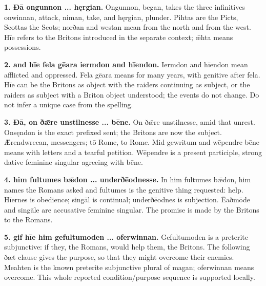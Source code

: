 \textbf{1. Ðā ongunnon ... hęrgian.} Ongunnon, began, takes the three infinitives onwinnan, attack, niman, take, and hęrgian, plunder. Pihtas are the Picts, Scottas the Scots; norðan and westan mean from the north and from the west. Hīe refers to the Britons introduced in the separate context; ǣhta means possessions.

\textbf{2. and hīe fela gēara iermdon and hīendon.} Iermdon and hīendon mean afflicted and oppressed. Fela gēara means for many years, with genitive after fela. Hīe can be the Britons as object with the raiders continuing as subject, or the raiders as subject with a Briton object understood; the events do not change. Do not infer a unique case from the spelling.

\textbf{3. Ðā, on ðǣre unstilnesse ... bēne.} On ðǣre unstilnesse, amid that unrest. Onsęndon is the exact prefixed sent; the Britons are now the subject. Ǣrendwrecan, messengers; tō Rome, to Rome. Mid gewritum and wēpendre bēne means with letters and a tearful petition. Wēpendre is a present participle, strong dative feminine singular agreeing with bēne.

\textbf{4. him fultumes bǣdon ... underðēodnesse.} In him fultumes bǣdon, him names the Romans asked and fultumes is the genitive thing requested: help. Hīernes is obedience; singāl is continual; underðēodnes is subjection. Ēaðmōde and singāle are accusative feminine singular. The promise is made by the Britons to the Romans.

\textbf{5. gif hīe him gefultumoden ... oferwinnan.} Gefultumoden is a preterite subjunctive: if they, the Romans, would help them, the Britons. The following ðæt clause gives the purpose, so that they might overcome their enemies. Meahten is the known preterite subjunctive plural of magan; oferwinnan means overcome. This whole reported condition/\allowbreak{}purpose sequence is supported locally.

